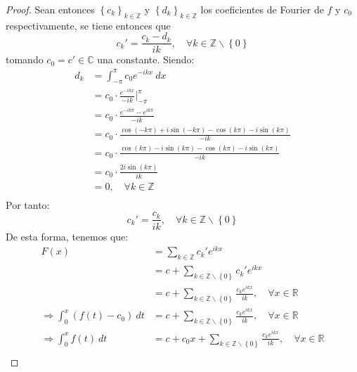 \documentclass[12pt]{report}
\theoremstyle{largebreak}
\begin{document}
\begin{proof}
        Sean entonces $\left\{c_k \right\}_{ k\in\mathbb{Z}}$ y $\left\{d_k \right\}_{ k\in\mathbb{Z}}$ los coeficientes de Fourier de $f$ y $c_0$ respectivamente, se tiene entonces que
        \begin{equation*}
            c_k'=\frac{c_k-d_k}{ik},\quad\forall k\in\mathbb{Z}\backslash\left\{0\right\}
        \end{equation*}
        tomando $c_0=c'\in\mathbb{C}$ una constante. Siendo:
        \begin{equation*}
            \begin{split}
                d_k&=\int_{-\pi}^\pi c_0e^{ -ikx}\:dx\\
                &=c_0\cdot\frac{e^{ -ikx}}{-ik}\Big|_{-\pi}^\pi\\
                &=c_0\cdot\frac{e^{ -ik\pi}-e^{ik\pi}}{-ik}\\
                &=c_0\cdot\frac{\cos(-k\pi)+i\sin(-k\pi)-\cos(k\pi)-i\sin(k\pi)}{-ik}\\
                &=c_0\cdot\frac{\cos(k\pi)-i\sin(k\pi)-\cos(k\pi)-i\sin(k\pi)}{-ik}\\
                &=c_0\cdot\frac{2i\sin(k\pi)}{ik}\\
                &=0,\quad\forall k\in\mathbb{Z} \\
            \end{split}
        \end{equation*}
        Por tanto:
        \begin{equation*}
            c_k'=\frac{c_k}{ik},\quad\forall k\in\mathbb{Z}\backslash\left\{0\right\}
        \end{equation*}
        De esta forma, tenemos que:
        \begin{equation*}
            \begin{split}
                F(x)&=\sum_{ k\in\mathbb{Z}}c_k'e^{ ikx}\\
                &=c+\sum_{k\in\mathbb{Z}\backslash\left\{0\right\}}c_k'e^{ ikx}\\
                &=c+\sum_{k\in\mathbb{Z}\backslash\left\{0\right\}}\frac{c_ke^{ ikx}}{ik},\quad\forall x\in\mathbb{R} \\
                \Rightarrow \int_{0}^{x}(f(t)-c_0)\:dt&=c+\sum_{k\in\mathbb{Z}\backslash\left\{0\right\}}\frac{c_ke^{ ikx}}{ik},\quad\forall x\in\mathbb{R} \\
                \Rightarrow \int_{0}^{x}f(t)\:dt&=c+c_0x+\sum_{k\in\mathbb{Z}\backslash\left\{0\right\}}\frac{c_ke^{ ikx}}{ik},\quad\forall x\in\mathbb{R} \\

\end{split}
\end{equation*}
\end{proof}
\end{document}
